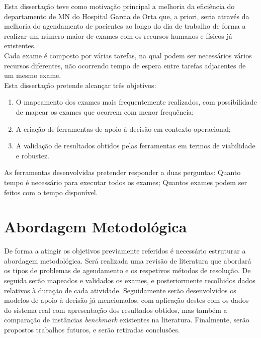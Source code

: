 Esta dissertação teve como motivação principal a melhoria da eficiência do departamento de MN do Hospital Garcia de Orta que, a priori, seria através da melhoria do agendamento de pacientes ao longo do dia de trabalho de forma a realizar um número maior de exames com os recursos humanos e físicos já existentes.\\
Cada exame é composto por várias tarefas, na qual podem ser necessários vários recursos diferentes, não ocorrendo tempo de espera entre tarefas adjacentes de um mesmo exame.\\
Esta dissertação pretende alcançar três objetivos: 
\begin{enumerate}
  \item O mapeamento dos exames mais frequentemente realizados, com possibilidade de mapear os exames que ocorrem com menor frequência;
  \item A criação de ferramentas de apoio à decisão em contexto operacional;
  \item A validação de resultados obtidos pelas ferramentas em termos de viabilidade e robustez.
\end{enumerate}

As ferramentas desenvolvidas pretender responder a duas perguntas: Quanto tempo é necessário para executar todos os exames; Quantos exames podem ser feitos com o tempo disponível.\\

\section{Abordagem Metodológica}
\label{sec:abordagem_metodológica}

De forma a atingir os objetivos previamente referidos é necessário estruturar a abordagem metodológica. Será realizada uma revisão de literatura que abordará os tipos de problemas de agendamento e os respetivos métodos de resolução. De seguida serão mapeados e validados os exames, e posteriormente recolhidos dados relativos à duração de cada atividade. Seguidamente serão desenvolvidos os modelos de apoio à decisão já mencionados, com aplicação destes com os dados do sistema real com apresentação dos resultados obtidos, mas também a comparação de instâncias \textit{benchmark} existentes na literatura. Finalmente, serão propostos trabalhos futuros, e serão retiradas conclusões.\\
